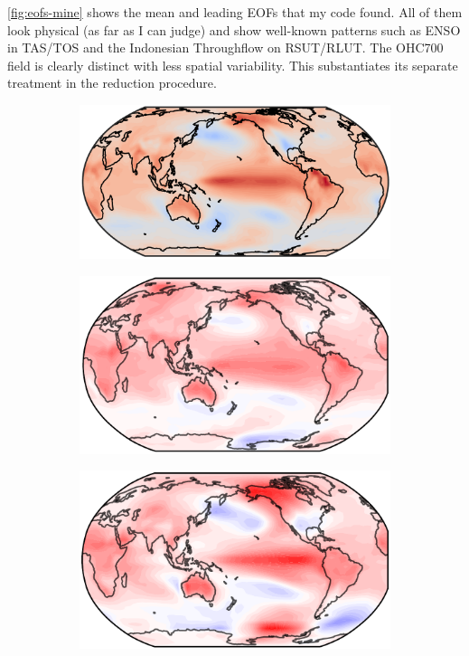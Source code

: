 \documentclass[parskip=half,DIV=16]{scrartcl}
\begin{document}
\cref{fig:eofs-mine} shows the mean and leading \glspl{EOF} that my code found. All of them look physical (as far as I can judge) and show well-known patterns such as ENSO in TAS/TOS and the Indonesian Throughflow on RSUT/RLUT. The OHC700 field is clearly distinct with less spatial variability. This substantiates its separate treatment in the reduction procedure.

\begin{figure}[h]
    \centering

    \begin{subfigure}[c]{0.3\textwidth}
        \includegraphics[width=\textwidth]{figures/eoftas_mine.png}
        \label{fig:eofs-ph-mine}
     \end{subfigure}
     \hfill
     \begin{subfigure}[c]{0.3\textwidth}
        \includegraphics[width=\textwidth]{figures/eoftas_ph17_mpi.png}
     \end{subfigure}
     \hfill
     \begin{subfigure}[c]{0.3\textwidth}
        \includegraphics[width=\textwidth]{figures/eoftas_ph17_ccsm.png}

\end{subfigure}
\end{figure}
\end{document}
